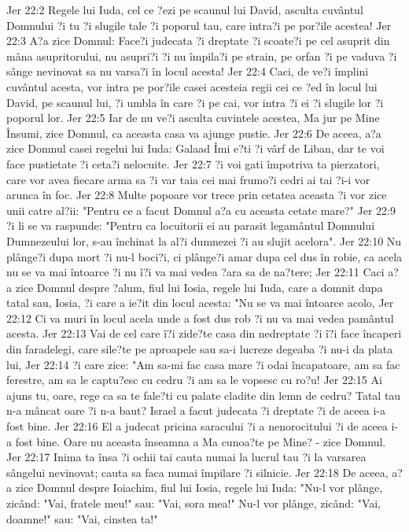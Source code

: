 Jer 22:2  Regele lui Iuda, cel ce ?ezi pe scaunul lui David, asculta cuvântul Domnului ?i tu ?i slugile tale ?i poporul tau, care intra?i pe por?ile acestea!
Jer 22:3  A?a zice Domnul: Face?i judecata ?i dreptate ?i scoate?i pe cel asuprit din mâna asupritorului, nu asupri?i ?i nu împila?i pe strain, pe orfan ?i pe vaduva ?i sânge nevinovat sa nu varsa?i în locul acesta!
Jer 22:4  Caci, de ve?i împlini cuvântul acesta, vor intra pe por?ile casei acesteia regii cei ce ?ed în locul lui David, pe scaunul lui, ?i umbla în care ?i pe cai, vor intra ?i ei ?i slugile lor ?i poporul lor.
Jer 22:5  Iar de nu ve?i asculta cuvintele acestea, Ma jur pe Mine Însumi, zice Domnul, ca aceasta casa va ajunge pustie.
Jer 22:6  De aceea, a?a zice Domnul casei regelui lui Iuda: Galaad Îmi e?ti ?i vârf de Liban, dar te voi face pustietate ?i ceta?i nelocuite.
Jer 22:7  ?i voi gati împotriva ta pierzatori, care vor avea fiecare arma sa ?i var taia cei mai frumo?i cedri ai tai ?i-i vor arunca în foc.
Jer 22:8  Multe popoare vor trece prin cetatea aceasta ?i vor zice unii catre al?ii: "Pentru ce a facut Domnul a?a cu aceasta cetate mare?"
Jer 22:9  ?i li se va raspunde: "Pentru ca locuitorii ei au parasit legamântul Domnului Dumnezeului lor, s-au închinat la al?i dumnezei ?i au slujit acelora".
Jer 22:10  Nu plânge?i dupa mort ?i nu-l boci?i, ci plânge?i amar dupa cel dus în robie, ca acela nu se va mai întoarce ?i nu î?i va mai vedea ?ara sa de na?tere;
Jer 22:11  Caci a?a zice Domnul despre ?alum, fiul lui Iosia, regele lui Iuda, care a domnit dupa tatal sau, Iosia, ?i care a ie?it din locul acesta: "Nu se va mai întoarce acolo,
Jer 22:12  Ci va muri în locul acela unde a fost dus rob ?i nu va mai vedea pamântul acesta.
Jer 22:13  Vai de cel care î?i zide?te casa din nedreptate ?i î?i face încaperi din faradelegi, care sile?te pe aproapele sau sa-i lucreze degeaba ?i nu-i da plata lui,
Jer 22:14  ?i care zice: "Am sa-mi fac casa mare ?i odai încapatoare, am sa fac ferestre, am sa le captu?esc cu cedru ?i am sa le vopsesc cu ro?u!
Jer 22:15  Ai ajuns tu, oare, rege ca sa te fale?ti cu palate cladite din lemn de cedru? Tatal tau n-a mâncat oare ?i n-a baut? Israel a facut judecata ?i dreptate ?i de aceea i-a fost bine.
Jer 22:16  El a judecat pricina saracului ?i a nenorocitului ?i de aceea i-a fost bine. Oare nu aceasta înseamna a Ma cunoa?te pe Mine? - zice Domnul.
Jer 22:17  Inima ta însa ?i ochii tai cauta numai la lucrul tau ?i la varsarea sângelui nevinovat; cauta sa faca numai împilare ?i silnicie.
Jer 22:18  De aceea, a?a zice Domnul despre Ioiachim, fiul lui Iosia, regele lui Iuda: "Nu-l vor plânge, zicând: "Vai, fratele meu!" sau: "Vai, sora mea!" Nu-l vor plânge, zicând: "Vai, doamne!" sau: "Vai, cinstea ta!"
